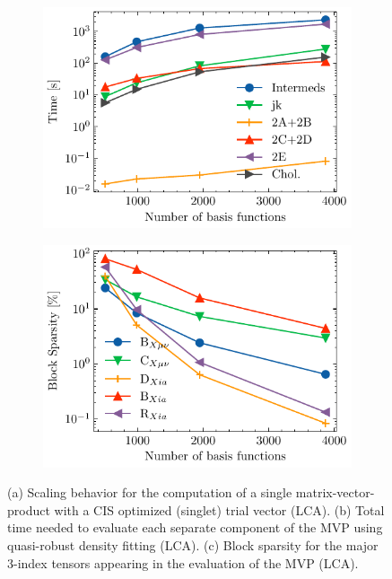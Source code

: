 \begin{figure}[htp]
\begin{subfigure}{0.45\textwidth}
\centering
\includegraphics[width=\textwidth]{Pics/adcsingle_acid}
\caption{}
\label{fig:ES_TIMESINGLE_LCA}
\end{subfigure}
\hfill
\begin{subfigure}{0.45\textwidth}
\centering
\includegraphics[width=\textwidth]{Pics/blocksparsity_acid}
\caption{}
\label{fig:ES_SPARSITY_LCA}
\end{subfigure}

\caption[Scaling behavior of CDD-DF-SOS-ADC(2) for LCA]{(a) Scaling behavior for the computation of a single matrix-vector-product with a CIS optimized (singlet) trial vector (LCA). (b) Total time needed to evaluate each separate component of the MVP using quasi-robust density fitting (LCA). (c) Block sparsity for the major 3-index tensors appearing in the evaluation of the MVP (LCA).}

\end{figure}

